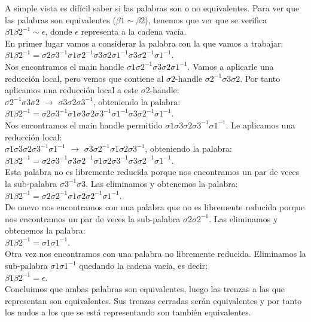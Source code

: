 A simple vista es difícil saber si las palabras son o no equivalentes. Para ver que las palabras son equivalentes ($\beta1 \sim \beta2$), tenemos que ver que se verifica $\beta1 \beta2^{-1} \sim \epsilon$, donde $\epsilon$ representa a la cadena vacía.\\

En primer lugar vamos a considerar la palabra con la que vamos a trabajar:\\
$\beta1 \beta2^{-1} =\sigma2\sigma3^{-1}\sigma1\sigma2^{-1}\sigma3\sigma2\sigma1^{-1}\sigma3\sigma2^{-1}\sigma1^{-1}$.\\

Nos encontramos el main handle $ \sigma1\sigma2^{-1}\sigma3\sigma2\sigma1^{-1} $. Vamos a aplicarle una reducción local, pero vemos que contiene al $\sigma2$-handle $\sigma2^{-1}\sigma3\sigma2$. Por tanto aplicamos una reducción local a este $\sigma2$-handle:\\
$\sigma2^{-1}\sigma3\sigma2$ $\rightarrow$ $\sigma3\sigma2\sigma3^{-1}$, obteniendo la palabra:\\
$\beta1 \beta2^{-1} =\sigma2\sigma3^{-1}\sigma1\sigma3\sigma2\sigma3^{-1}\sigma1^{-1}\sigma3\sigma2^{-1}\sigma1^{-1}$.\\

Nos encontramos el main handle permitido $\sigma1\sigma3\sigma2\sigma3^{-1}\sigma1^{-1}$. Le aplicamos una reducción local:\\ 
$\sigma1\sigma3\sigma2\sigma3^{-1}\sigma1^{-1}$ $\rightarrow$ $\sigma3\sigma2^{-1}\sigma1\sigma2\sigma3^{-1}$, obteniendo la palabra:\\
$\beta1 \beta2^{-1} =\sigma2\sigma3^{-1}\sigma3\sigma2^{-1}\sigma1\sigma2\sigma3^{-1}\sigma3\sigma2^{-1}\sigma1^{-1}$.\\

Esta palabra no es libremente reducida porque nos encontramos un par de veces la sub-palabra $ \sigma3^{-1}\sigma3 $. Las eliminamos y obtenemos la palabra:\\
$\beta1 \beta2^{-1} =\sigma2\sigma2^{-1}\sigma1\sigma2\sigma2^{-1}\sigma1^{-1}$.\\

De nuevo nos encontramos con una palabra que no es libremente reducida porque nos encontramos un par de veces la sub-palabra $ \sigma2\sigma2^{-1} $. Las eliminamos y obtenemos la palabra:\\
$\beta1 \beta2^{-1} =\sigma1\sigma1^{-1}$.\\

Otra vez nos encontramos con una palabra no libremente reducida. Eliminamos la sub-palabra $\sigma1\sigma1^{-1}$ quedando la cadena vacía, es decir:\\
$\beta1 \beta2^{-1} =\epsilon$.\\

Concluimos que ambas palabras son equivalentes, luego las trenzas a las que representan son equivalentes. Sus trenzas cerradas serán equivalentes y por tanto los nudos a los que se está representando son también equivalentes.\\
